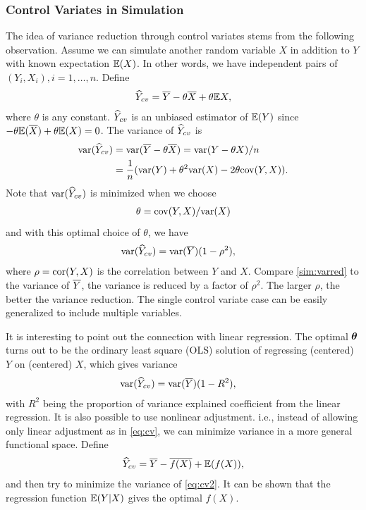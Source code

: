 \documentclass{sig-alternate}
\begin{document}
\subsubsection{Control Variates in Simulation}\label{cvsim}
The idea of variance reduction through control variates stems from the following observation. Assume we can simulate another random variable $X$ in addition to $Y$ with known expectation $\mathbb{E}(X)$. In other words, we have independent pairs of $(Y_i, X_i),i=1,\dots,n$. Define 
\begin{align}\label{eq:cv}
\widehat{Y}_{cv} = \overline{Y} - \theta\overline{X} + \theta\mathbb{E} X,
\end{align}
where $\theta$ is any constant. 
$\widehat{Y}_{cv}$ is an unbiased estimator of $\mathbb{E}(Y)$ since $- \theta\mathbb{E}(\overline{X})+\theta\mathbb{E}(X) = 0$. The variance of $\widehat{Y}_{cv}$ is
\begin{align*}
\mathrm{var} (\widehat{Y}_{cv}) &= \mathrm{var} (\overline{Y} - \theta \overline{X}) = \mathrm{var} (Y-\theta X)/n  \\
&=\frac{1}{n} (\mathrm{var}(Y) + \theta^2\mathrm{var}(X) - 2\theta\mathrm{cov} (Y,X)).
\end{align*}
Note that $\mathrm{var} (\widehat{Y}_{cv})$ is minimized when we choose 
\begin{align}
\theta = \mathrm{cov}(Y,X)/\mathrm{var}(X)\label{eq:optTheta}
\end{align}
and with this optimal choice of $\theta$, we have 
\begin{align}\label{sim:varred} 
\mathrm{var} (\widehat{Y}_{cv}) &= \mathrm{var}(\overline{Y}) (1- \rho^2) ,
\end{align}
where $\rho = \mathrm{cor} (Y,X)$ is the correlation between $Y$ and $X$. Compare  \eqref{sim:varred} to the variance of $\overline{Y}$, the variance is reduced by a factor of $\rho^2$.  The larger $\rho$, the better the variance reduction. The single control variate case can be easily generalized to include multiple variables. 

It is interesting to point out the connection with linear regression.
The optimal $\boldsymbol{\theta}$ turns out to be the ordinary least square (OLS) solution of regressing (centered) $Y$ on (centered) $X$,
which gives variance  
\begin{align*} 
\mathrm{var} (\widehat{Y}_{cv}) &= \mathrm{var}(\overline{Y}) (1- R^2) ,
\end{align*}
with $R^2$ being the proportion of variance explained coefficient from the linear regression. It is also possible to use nonlinear adjustment. i.e., instead of allowing only linear adjustment as in \eqref{eq:cv}, we can minimize variance in a more general  functional space. Define 
\begin{align}\label{eq:cv2}
\widehat{Y}_{cv} = \overline{Y} - \overline{f(X)} + \mathbb{E}(f(X)),
\end{align}
and then try to minimize the variance of \eqref{eq:cv2}. It can be shown that the regression function $\mathbb{E} (Y|X)$ gives the optimal $f(X)$.
\end{document}
